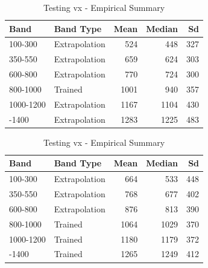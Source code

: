 \documentclass[
  letterpaper,
  DIV=11,
  numbers=noendperiod,
  oneside]{scrartcl}
\begin{document}
\begin{table}

\caption{\label{tbl-e1-test-nf-vx}Testing vx - Empirical Summary}

\begin{minipage}[t]{\linewidth}

\begin{tabular}[t]{llrrr}
\toprule
Band & Band Type & Mean & Median & Sd\\
\midrule
100-300 & Extrapolation & 524 & 448 & 327\\
350-550 & Extrapolation & 659 & 624 & 303\\
600-800 & Extrapolation & 770 & 724 & 300\\
800-1000 & Trained & 1001 & 940 & 357\\
1000-1200 & Extrapolation & 1167 & 1104 & 430\\
\addlinespace
1200-1400 & Extrapolation & 1283 & 1225 & 483\\
\bottomrule
\end{tabular}

\end{minipage}%
\newline
\begin{minipage}[t]{\linewidth}

\begin{tabular}[t]{llrrr}
\toprule
Band & Band Type & Mean & Median & Sd\\
\midrule
100-300 & Extrapolation & 664 & 533 & 448\\
350-550 & Extrapolation & 768 & 677 & 402\\
600-800 & Extrapolation & 876 & 813 & 390\\
800-1000 & Trained & 1064 & 1029 & 370\\
1000-1200 & Trained & 1180 & 1179 & 372\\
\addlinespace
1200-1400 & Trained & 1265 & 1249 & 412\\
\bottomrule
\end{tabular}

\end{minipage}%

\end{table}%
\end{document}
